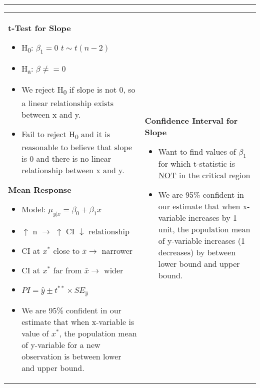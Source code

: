\documentclass[6pt]{article}
\newcommand{\HL}{\par\noindent\rule{\textwidth}{0.4pt}}
\begin{document}
\begin{footnotesize}
\HL

\begin{tabular}{l | l}

\parbox{0.4\textwidth}{

\begin{flushleft}
\textbf{t-Test for Slope}
\end{flushleft}

\begin{itemize}

\item H\textsubscript{0}: $\beta_{1} = 0$ {$t \sim t(n-2)$}
\item H\textsubscript{a}: $\beta \ne = 0$
\item We reject H\textsubscript{0} if slope is not 0, so a linear relationship exists between x and y.
\item Fail to reject H\textsubscript{0} and it is reasonable to believe that slope is 0 and there is no linear relationship between x and y.

\end{itemize}

\begin{flushleft}
\textbf{Mean Response}
\end{flushleft}

\begin{itemize}
\item Model: $\mu_{y|x} = \beta_{0} + \beta_{1}x$
\item $\uparrow$ n $\rightarrow$ $\uparrow$ CI $\downarrow$ relationship
\item CI at $x^{\ast}$ close to $\bar{x} \rightarrow$ narrower
\item CI at $x^{\ast}$ far from $\bar{x} \rightarrow$ wider
\item $PI = \hat{y} \pm t^{\ast\ast} \times SE_{\hat{y}}$
\item We are 95\% confident in our estimate that when x-variable is value of $x^{\ast}$, the population mean of y-variable for a new observation is between lower and upper bound.
\end{itemize}

}

&

\parbox{0.5\textwidth}{

\begin{flushleft}

\textbf{Confidence Interval for Slope}
\begin{itemize}

\item Want to find values of $\beta_{1}$ for which t-statistic is \underline{NOT} in the critical region
\item We are 95\% confident in our estimate that when x-variable increases by 1 unit, the population mean of y-variable increases (1 decreases) by between lower bound and upper bound.


\end{itemize}
\end{flushleft}}
\end{tabular}
\end{footnotesize}
\end{document}
